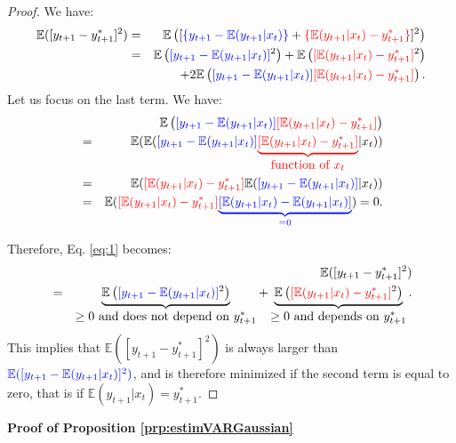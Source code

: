 \documentclass[
  11pt,
]{book}
\theoremstyle{definition}
\theoremstyle{definition}
\theoremstyle{definition}
\theoremstyle{definition}
\theoremstyle{remark}
\begin{document}
\begin{proof}
We have:
\begin{eqnarray}
\mathbb{E}([y_{t+1} - y^*_{t+1}]^2) &=& \mathbb{E}\left([{\color{blue}\{y_{t+1} - \mathbb{E}(y_{t+1}|x_t)\}} + {\color{red}\{\mathbb{E}(y_{t+1}|x_t)  - y^*_{t+1}\}}]^2\right)\nonumber\\
&=&  \mathbb{E}\left({\color{blue}[y_{t+1} - \mathbb{E}(y_{t+1}|x_t)]}^2\right) + \mathbb{E}\left({\color{red}[\mathbb{E}(y_{t+1}|x_t)  - y^*_{t+1}]}^2\right)\nonumber\\
&& + 2\mathbb{E}\left( {\color{blue}[y_{t+1} - \mathbb{E}(y_{t+1}|x_t)]}{\color{red} [\mathbb{E}(y_{t+1}|x_t)  - y^*_{t+1}]}\right). \label{eq:1}
\end{eqnarray}
Let us focus on the last term. We have:
\begin{eqnarray*}
&&\mathbb{E}\left({\color{blue}[y_{t+1} - \mathbb{E}(y_{t+1}|x_t)]}{\color{red} [\mathbb{E}(y_{t+1}|x_t)  - y^*_{t+1}]}\right)\\
&=& \mathbb{E}( \mathbb{E}( {\color{blue}[y_{t+1} - \mathbb{E}(y_{t+1}|x_t)]}{\color{red} \underbrace{[\mathbb{E}(y_{t+1}|x_t)  - y^*_{t+1}]}_{\mbox{function of $x_t$}}}|x_t))\\
&=& \mathbb{E}( {\color{red} [\mathbb{E}(y_{t+1}|x_t)  - y^*_{t+1}]} \mathbb{E}( {\color{blue}[y_{t+1} - \mathbb{E}(y_{t+1}|x_t)]}|x_t))\\
&=& \mathbb{E}( {\color{red} [\mathbb{E}(y_{t+1}|x_t)  - y^*_{t+1}]} {\color{blue}\underbrace{[\mathbb{E}(y_{t+1}|x_t) - \mathbb{E}(y_{t+1}|x_t)]}_{=0}})=0.
\end{eqnarray*}

Therefore, Eq. \eqref{eq:1} becomes:
\begin{eqnarray*}
&&\mathbb{E}([y_{t+1} - y^*_{t+1}]^2) \\
&=&  \underbrace{\mathbb{E}\left({\color{blue}[y_{t+1} - \mathbb{E}(y_{t+1}|x_t)]}^2\right)}_{\mbox{$\ge 0$ and does not depend on $y^*_{t+1}$}} + \underbrace{\mathbb{E}\left({\color{red}[\mathbb{E}(y_{t+1}|x_t)  - y^*_{t+1}]}^2\right)}_{\mbox{$\ge 0$ and depends on $y^*_{t+1}$}}.
\end{eqnarray*}
This implies that \(\mathbb{E}([y_{t+1} - y^*_{t+1}]^2)\) is always larger than \({\color{blue}\mathbb{E}([y_{t+1} - \mathbb{E}(y_{t+1}|x_t)]^2)}\), and is therefore minimized if the second term is equal to zero, that is if \(\mathbb{E}(y_{t+1}|x_t) = y^*_{t+1}\).
\end{proof}

\textbf{Proof of Proposition \ref{prp:estimVARGaussian}}
\end{document}
